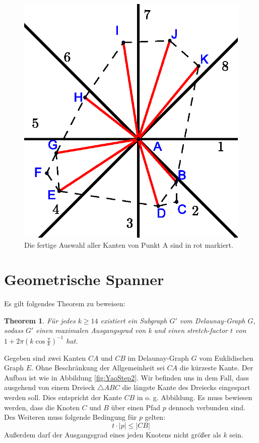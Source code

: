 \documentclass[a4paper,twoside]{IEEEtran}
\newtheorem{boundedSpannerTheorem}{Theorem}[section]
\begin{document}
\begin{figure}[h!]
\centering
\includegraphics[width=0.6\linewidth]{finished_A.eps}
\caption{Die fertige Auswahl aller Kanten von Punkt A sind in rot markiert.}
\label{fig:finished_a}
\end{figure}

\section{Geometrische Spanner}

Es gilt folgendes Theorem zu beweisen:

\begin{boundedSpannerTheorem}
Für jedes $k \geq 14 $ existiert ein Subgraph $G' $ vom Delaunay-Graph $G $, sodass $G' $ einen maximalen Ausgangsgrad von k und einen stretch-factor $t $ von $1+2\pi(k \cos{\frac{\pi}{k}})^{-1} $ hat.
\end{boundedSpannerTheorem}
Gegeben sind zwei Kanten $CA $ und $CB $ im Delaunay-Graph $G $ vom Euklidischen Graph $E $.
Ohne Beschränkung der Allgemeinheit sei $CA $ die kürzeste Kante.
Der Aufbau ist wie in Abbildung \ref{fig:YaoStep2}.
Wir befinden uns in dem Fall, dass ausgehend von einem Dreieck $\triangle{ABC} $ die längste Kante des Dreiecks eingespart werden soll.
Dies entspricht der Kante $CB $ in o. g. Abbildung.
Es muss bewiesen werden, dass die Knoten $C $ und $B $ über einen Pfad $p $ dennoch verbunden sind.
Des Weiteren muss folgende Bedingung für $p $ gelten:
\begin{equation*}
 t \cdot |p| \leq	|CB| 
\end{equation*}
Außerdem darf der Ausgangsgrad eines jeden Knotens nicht größer als $k $ sein.
\end{document}
